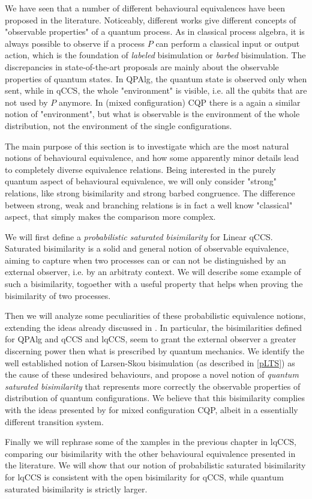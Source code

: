 We have seen that a number of different behavioural equivalences have been proposed in the literature. Noticeably, different works give different concepts of "observable properties" of a quantum process. As in classical process algebra, it is always possible to observe if a process $P$ can perform a classical input or output action, which is the foundation of \textit{labeled} bisimulation or \textit{barbed} bisimulation. The discrepancies in state-of-the-art proposals are mainly about the observable properties of quantum states. In QPAlg, the quantum state is observed only when sent, while in qCCS, the whole "environment" is visible, i.e. all the qubits that are not used by $P$ anymore. In (mixed configuration) CQP there is a again a similar notion of "environment", but what is observable is the environment of the whole distribution, not the environment of the single configurations.

The main purpose of this section is to investigate which are the most natural notions of behavioural equivalence, and how some apparently minor details lead to completely diverse equivalence relations. Being interested in the purely quantum aspect of behavioural equivalence, we will only consider "strong" relations, like strong bisimilarity and strong barbed congruence. The difference between strong, weak and branching relations is in fact a well know "classical" aspect, that simply makes the comparison more complex.

We will first define a \textit{probabilistic saturated bisimilarity} \cite{bonchiGeneralTheoryBarbs2014} for Linear qCCS. Saturated bisimilarity is a solid and general notion of observable equivalence, aiming to capture when two processes can or can not be distinguished by an external observer, i.e. by an arbitraty context. We will describe some example of such a bisimilarity, togoether with a useful property that helps when proving the bisimilarity of two processes.

Then we will analyze some peculiarities of these probabilistic equivalence notions, extending the ideas already discussed in \cite{davidsonFormalVerificationTechniques2012}. In particular, the bisimilarities defined for QPAlg and qCCS and lqCCS, seem to grant the external observer a greater discerning power then what is prescribed by quantum mechanics.
We identify the well established notion of Larsen-Skou bisimulation (as described in \ref{pLTS}) as the cause of these undesired behaviours, and propose a novel notion of \textit{quantum saturated bisimilarity} that represents more correctly the observable properties of distribution of quantum configurations. We believe that this bisimilarity complies with the ideas presented by \cite{davidsonFormalVerificationTechniques2012} for mixed configuration CQP, albeit in a essentially different transition system.

Finally we will rephrase some of the xamples in  the previous chapter in lqCCS, comparing our bisimilarity with the other behavioural equivalence presented in the literature. We will show that our notion of probabilistic saturated bisimilarity for lqCCS is consistent with the open bisimilarity  \cite{dengOpenBisimulationQuantum2012} for qCCS, while quantum saturated bisimilarity is strictly larger.